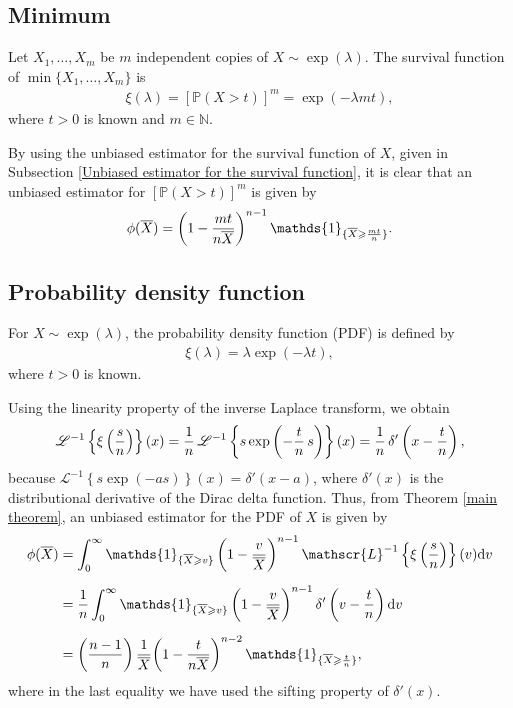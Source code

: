 \documentclass[12pt]{article}
\theoremstyle{definition}
\begin{document}
\subsection{Minimum}

Let $X_1,\ldots,X_m$ be $m$ independent copies of $X\sim\exp(\lambda)$. The survival function of $\min\{X_1,\ldots,X_m\}$ is
\begin{align*}
	\xi(\lambda)=[\mathbb{P}(X> t)]^m=\exp(-\lambda m t),
\end{align*}
where $t>0$ is known and $m\in\mathbb{N}$. 

By using the unbiased estimator for the survival function of $X$, given in Subsection \ref{Unbiased estimator for the survival function}, it is clear that an unbiased estimator for $[\mathbb{P}(X> t)]^m$ is given by
\begin{align*}
	\phi(\overline{X})
	=
	{\left(1 - {mt\over n \overline{X}}\right)^{n-1}} \, \mathds{1}_{\{\overline{X}\geqslant {mt\over n}\}}. 
\end{align*}






\subsection{Probability density function}


For $X\sim\exp(\lambda)$, the probability density function (PDF) is defined by
\begin{align*}
	\xi(\lambda)=\lambda\exp(-\lambda t),
\end{align*}
where $t>0$ is known. 

Using the linearity property of the inverse Laplace transform, we obtain
\begin{align*}
	\mathscr{L}^{-1}\left\{	
	{\displaystyle \xi\left({s\over n}\right)}
	\right\}
	(x)
	=
	{1\over n}\,
	\mathscr{L}^{-1}\left\{	
	{\displaystyle
		s
		\exp\left(-{t\over n} \, s\right)}
	\right\}(x) 
	=
	{1\over n}\,
	\delta'\left(x-{t\over n}\right),
\end{align*}
because $\mathscr{L}^{-1}\left\{s\exp(-as)\right\}(x)=\delta'\left(x-a\right)$, where $\delta'(x)$ is the distributional derivative of the Dirac delta function.
Thus, from Theorem \ref{main theorem}, an unbiased estimator for the PDF of  $X$ is given by
\begin{align*}
	\phi(\overline{X})
	&=
	\int_0^{\infty} 
	\mathds{1}_{\{\overline{X}\geqslant v\}}
	\left(1-{v\over \overline{X}}\right)^{n-1} 
	\mathscr{L}^{-1}\left\{\xi\left({s\over n}\right)
	\right\}(v){\rm d}v
	\\[0,2cm]
	&=
	{1\over n}
	\int_0^{\infty} 
	\mathds{1}_{\{\overline{X}\geqslant v\}}
	\left(1-{v\over \overline{X}}\right)^{n-1} 
	\delta'\left(v-{t\over n}\right) 
	{\rm d}v
	\\[0,2cm]
	&=
	\left({n-1\over n}\right) {1\over\overline{X}}
	{\left(1 - {t\over n \overline{X}}\right)^{n-2}} \, \mathds{1}_{\{\overline{X}\geqslant {t\over n}\}},
\end{align*}
where in the last equality we have used the sifting property of $\delta'(x)$.
\end{document}
